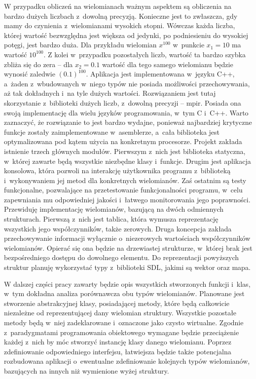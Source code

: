 W przypadku obliczeń na wielomianach ważnym aspektem są obliczenia na bardzo dużych liczbach z~dowolną precyzją. Konieczne jest to zwłaszcza, gdy mamy do czynienia z~wielomianami wysokich stopni. Wówczas każda liczba, której wartość bezwzględna jest większa od jedynki, po podniesieniu do wysokiej potęgi, jest bardzo duża. Dla przykładu wielomian $x^{100}$ w~punkcie $x_1=10$ ma wartość $10^{100}$. Z kolei w~przypadku pozostałych liczb, wartość ta bardzo szybka zbliża się do zera – dla $x_2=0.1$ wartość dla tego samego wielomianu będzie wynosić zaledwie $(0.1)^{100}$. Aplikacja jest implementowana w~języku C++, a~żaden z~wbudowanych w~niego typów nie posiada możliwości przechowywania, aż tak dokładnych i~na tyle dużych wartości. Rozwiązaniem jest tutaj skorzystanie z~biblioteki dużych liczb, z~dowolną precyzji – mpir. Posiada ona swoją implementację dla wielu języków programowania, w~tym C i~C++.  Warto zaznaczyć, że rozwiązanie to jest bardzo wydajne, ponieważ najbardziej krytyczne funkcje zostały zaimplementowane w~asemblerze, a~cała biblioteka jest optymalizowana pod kątem użycia na konkretnym procesorze.
Projekt zakłada istnienie trzech głównych modułów. Pierwszym z~nich jest biblioteka statyczna, w~której zawarte będą wszystkie niezbędne klasy i~funkcje. Drugim jest aplikacja konsolowa, która pozwoli na interakcję użytkownika programu z~biblioteką i~wykonywaniem jej metod dla konkretnych wielomianów. Zaś ostatnim są testy funkcjonalne, pozwalające na przetestowanie funkcjonalności programu, w~celu zapewniania mu odpowiedniej jakości i~łatwego monitorowania jego poprawności.
Przewiduję implementację wielomianów, bazującą na dwóch odmiennych strukturach. Pierwszą z~nich jest tablica, która wymusza reprezentację wszystkich jego współczynników, także zerowych. Druga koncepcja zakłada przechowywanie informacji wyłącznie o~niezerowych wartościach  współczynników wielomianów. Opierać się ona będzie na drzewiastej strukturze, w~której brak jest bezpośredniego dostępu do dowolnego elementu. Do reprezentacji powyższych struktur planuję wykorzystać typy z~biblioteki SDL, jakimi są wektor oraz mapa.

W dalszej części pracy zawarty będzie opis wszystkich stworzonych funkcji i~klas, w~tym dokładna analiza porównawcza obu typów wielomianów. Planowane jest stworzenie abstrakcyjnej klasy, posiadającej metody, które będą całkowicie niezależne od reprezentującej dany wielomian struktury. Wszystkie pozostałe metody będą w~niej zadeklarowane i~oznaczone jako czysto wirtualne. Zgodnie z~paradygmatami programowania obiektowego wymagane będzie przeciążenie każdej z~nich by móc stworzyć instancję klasy danego wielomianu. Poprzez zdefiniowanie odpowiedniego interfejsu, łatwiejsza będzie także potencjalna rozbudowana aplikacji o~ewentualne zdefiniowanie kolejnych typów wielomianów, bazujących na innych niż wymienione wyżej struktury.


